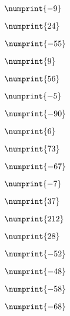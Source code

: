 {{\item$\numprint{-9}$  \item$\numprint{24}$  \item$\numprint{-55}$

\item$\numprint{9}$  \item$\numprint{56}$  \item$\numprint{-5}$

\item$\numprint{-90}$  \item$\numprint{6}$  \item$\numprint{73}$

\item$\numprint{-67}$  \item$\numprint{-7}$  \item$\numprint{37}$

\item$\numprint{212}$  \item$\numprint{28}$  \item$\numprint{-52}$

\item$\numprint{-48}$  \item$\numprint{-58}$  \item$\numprint{-68}$

}}